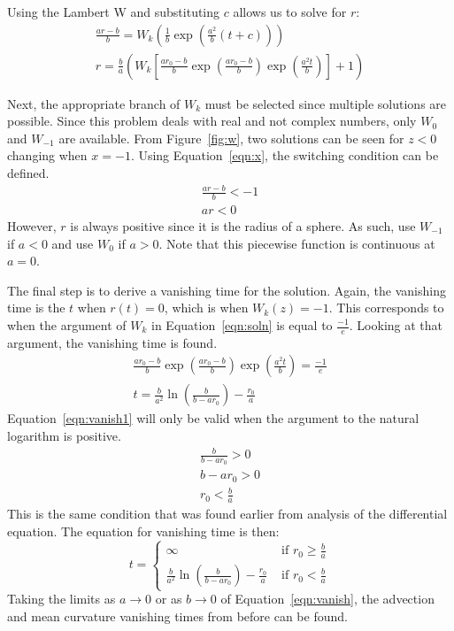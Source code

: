 \documentclass[journal]{IEEEtran}
\begin{document}
Using the Lambert W and substituting $c$ allows us to solve for $r$:
\begin{eqnarray}
  \frac{ar-b}{b} = W_k\left(\frac{1}{b}\exp\left(\frac{a^2}{b}(t+c)\right)\right) \\
  \label{eqn:soln}
  r = \frac{b}{a}\left(W_k\left[\frac{ar_0-b}{b} \exp\left(\frac{ar_0-b}{b}\right)\exp\left(\frac{a^2t}{b}\right)\right] + 1\right)
\end{eqnarray}

Next, the appropriate branch of $W_k$ must be selected since multiple solutions are possible.
Since this problem deals with real and not complex numbers, only $W_0$ and $W_{-1}$ are available.
From Figure~\ref{fig:w}, two solutions can be seen for $z < 0$ changing when $x = -1$.
Using Equation~\ref{eqn:x}, the switching condition can be defined.
\begin{eqnarray}
  \frac{ar-b}{b} < -1 \\
  ar < 0
\end{eqnarray}
However, $r$ is always positive since it is the radius of a sphere.
As such, use $W_{-1}$ if $a<0$ and use $W_0$ if $a>0$.
Note that this piecewise function is continuous at $a=0$.

The final step is to derive a vanishing time for the solution.
Again, the vanishing time is the $t$ when $r(t)=0$, which is when $W_k(z) = -1$.
This corresponds to when the argument of $W_k$ in Equation~\ref{eqn:soln} is equal to $\frac{-1}{e}$.
Looking at that argument, the vanishing time is found.
\begin{eqnarray}
  \frac{ar_0-b}{b} \exp\left(\frac{ar_0-b}{b}\right)\exp\left(\frac{a^2t}{b}\right) = \frac{-1}{e} \\
  \label{eqn:vanish1}
  t = \frac{b}{a^2} \ln\left(\frac{b}{b-ar_0}\right) - \frac{r_0}{a}
\end{eqnarray}
Equation~\ref{eqn:vanish1} will only be valid when the argument to the natural logarithm is positive.
\begin{eqnarray}
  \frac{b}{b-ar_0} > 0 \\
  b - ar_0 > 0 \\
  r_0 < \frac{b}{a}
\end{eqnarray}
This is the same condition that was found earlier from analysis of the differential equation.
The equation for vanishing time is then:
\begin{equation}
  \label{eqn:vanish}
  t = \left\{
    \begin{matrix}
      \infty & \text{ if } r_0 \geq \frac{b}{a} \\
      \frac{b}{a^2} \ln\left(\frac{b}{b-ar_0}\right) - \frac{r_0}{a} & \text{ if } r_0 < \frac{b}{a}
    \end{matrix}
  \right.
\end{equation}
Taking the limits as $a \rightarrow 0$ or as $b \rightarrow 0$ of Equation~\ref{eqn:vanish}, the advection and mean curvature vanishing times from before can be found.
\end{document}
